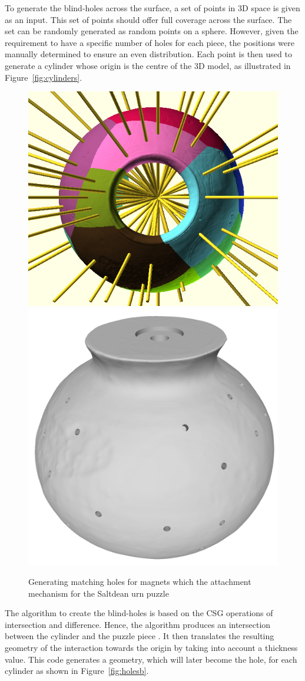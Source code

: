 \documentclass[acmlarge,screen,dvipsnames]{acmart}
\begin{document}
To generate the blind-holes across the surface, a set of points in 3D
space is given as an input. This set of points should offer full
coverage across the surface. The set can be randomly generated as
random points on a sphere. However, given the requirement to have a
specific number of holes for each piece, the positions were manually
determined to ensure an even distribution. Each point is then used to
generate a cylinder whose origin is the centre of the 3D model, as
illustrated in Figure~\ref{fig:cylinders}.
%
\begin{figure}[H]
  \centering
  {\includegraphics[width=0.45\linewidth]{images/allcylinders.jpg}}
  {\includegraphics[width=0.45\linewidth]{images/coreholes}}
 \caption{Generating \MSedit[of]{} matching holes for  magnets which  the attachment mechanism for the Saltdean urn puzzle}
\end{figure}

The algorithm to create the blind-holes is based on the CSG operations of intersection
and difference. Hence, the algorithm produces an intersection between the cylinder and  the puzzle piece . It then
translates the resulting geometry of the interaction towards the
origin by taking into account a thickness value. This code generates a
geometry, which will later become the hole, for each cylinder as shown
in Figure~\ref{fig:holesb}.
\end{document}
